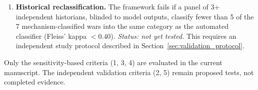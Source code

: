 \begin{enumerate}
    \item \textbf{Historical reclassification.} The framework fails if a panel of 3+ independent historians, blinded to model outputs, classify fewer than 5 of the 7 mechanism-classified wars into the same category as the automated classifier (Fleiss' kappa $< 0.40$). \textit{Status: not yet tested.} This requires an independent study protocol described in Section~\ref{sec:validation_protocol}.
\end{enumerate}

Only the sensitivity-based criteria (1, 3, 4) are evaluated in the current manuscript. The independent validation criteria (2, 5) remain proposed tests, not completed evidence.

